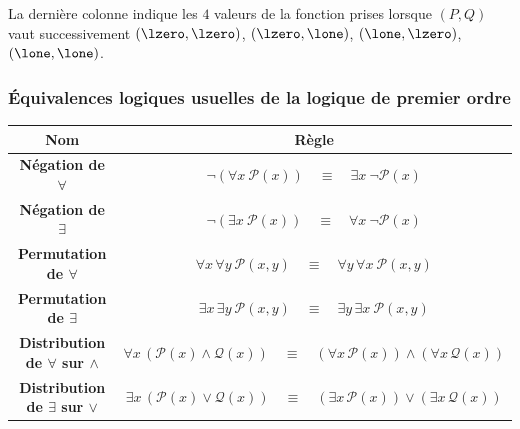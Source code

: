 \documentclass[11pt,class=report,crop=false]{standalone}
\begin{document}
\smallskip

La dernière colonne indique les $4$ valeurs de la fonction prises lorsque $(P,Q)$ vaut successivement $(\lzero,\lzero)$, $(\lzero,\lone)$, $(\lone,\lzero)$, $(\lone,\lone)$.

\subsubsection{Équivalences logiques usuelles de la logique de premier ordre}


\begin{center}
    \setlength{\tabcolsep}{18pt}
    \renewcommand{\arraystretch}{1.5}
    \begin{tabular}{|c|c|}
        \hline
        \textbf{Nom} & \textbf{Règle} \\
        \hline

        \textbf{Négation de $\forall$}
        &
        $\lnot(\forall x\ \mathcal P(x))
        \quad \equiv \quad
        \exists x\ \lnot\mathcal P(x)$
        \\ \hline

        \textbf{Négation de $\exists$}
        &
        $\lnot(\exists x\ \mathcal P(x))
        \quad \equiv \quad
        \forall x\ \lnot\mathcal P(x)$
        \\ \hline

        \textbf{Permutation de $\forall$}
        &
        $\forall x\,\forall y\ \mathcal P(x,y)
        \quad \equiv \quad
        \forall y\,\forall x\ \mathcal P(x,y)$
        \\ \hline

        \textbf{Permutation de $\exists$}
        &
        $\exists x\,\exists y\ \mathcal P(x,y)
        \quad \equiv \quad
        \exists y\,\exists x\ \mathcal P(x,y)$
        \\ \hline

        \textbf{Distribution de $\forall$ sur $\land$}
        &
        $\forall x\,(\mathcal P(x)\land\mathcal Q(x))
        \quad \equiv \quad
        (\forall x\,\mathcal P(x))
        \land
        (\forall x\,\mathcal Q(x))$
        \\ \hline

        \textbf{Distribution de $\exists$ sur $\lor$}
        &
        $\exists x\,(\mathcal P(x)\lor\mathcal Q(x))
        \quad \equiv \quad
        (\exists x\,\mathcal P(x))
        \lor
        (\exists x\,\mathcal Q(x))$
        \\ \hline


\end{tabular}
\end{center}
\end{document}
